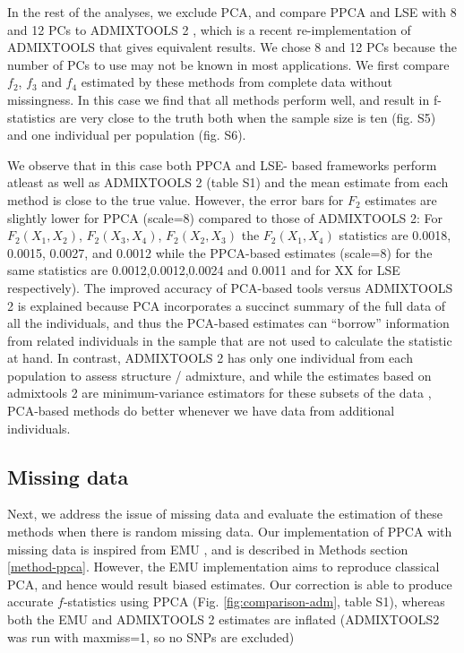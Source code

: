 \documentclass[12pt, letterpaper]{article}
\begin{document}
In the rest of the analyses, we exclude PCA, and compare PPCA and LSE with 8 and 12 PCs to ADMIXTOOLS 2 \cite{maier_limits_2022}, which is a recent re-implementation of ADMIXTOOLS \cite{patterson_ancient_2012} that gives equivalent results. We chose 8 and 12 PCs because the number of PCs to use may not be known in most applications. We first compare $f_2$, $f_3$ and $f_4$ estimated by these methods from complete data without missingness. In this case we find that all  methods perform well, and result in f-statistics are very close to the truth both when the sample size is ten (fig. S5) and one individual per population (fig. S6). 

We observe that in this case both PPCA and LSE- based frameworks perform atleast as well as ADMIXTOOLS 2 (table S1) and the mean estimate from each method is close to the true value. However, the error bars for $F_2$ estimates are slightly lower for PPCA (scale=8) compared to those of ADMIXTOOLS 2: For $F_2(X_1,X_2)$, $F_2(X_3,X_4)$, $F_2(X_2,X_3)$ the $F_2(X_1,X_4)$ statistics are 0.0018, 0.0015, 0.0027, and 0.0012 while the PPCA-based estimates (scale=8) for the same statistics are 0.0012,0.0012,0.0024 and 0.0011 and for XX for LSE respectively). The improved accuracy of PCA-based tools versus ADMIXTOOLS 2 is explained because PCA incorporates a succinct summary of the full data of all the individuals, and thus the PCA-based estimates can ``borrow'' information from related individuals in the sample that are not used to calculate the statistic at hand. In contrast, ADMIXTOOLS 2 has only one individual from each population to assess structure / admixture, and while the estimates based on admixtools 2 are minimum-variance estimators for these subsets of the data \citep{patterson_ancient_2012}, PCA-based methods do better whenever we have data from additional individuals.

\subsection{Missing data}
Next, we address the issue of missing data and evaluate the estimation of these methods when there is random missing data. Our implementation of PPCA with missing data is inspired from EMU \cite{meisner_large-scale_2021}, and is described in Methods section \ref{method-ppca}. However, the EMU implementation aims to reproduce classical PCA, and hence would result biased estimates. Our correction is able to produce accurate $f$-statistics using PPCA (Fig. \ref{fig:comparison-adm}, table S1), whereas both the EMU and  ADMIXTOOLS 2 estimates are inflated (ADMIXTOOLS2 was run with maxmiss=1, so no SNPs are excluded) 
\end{document}
